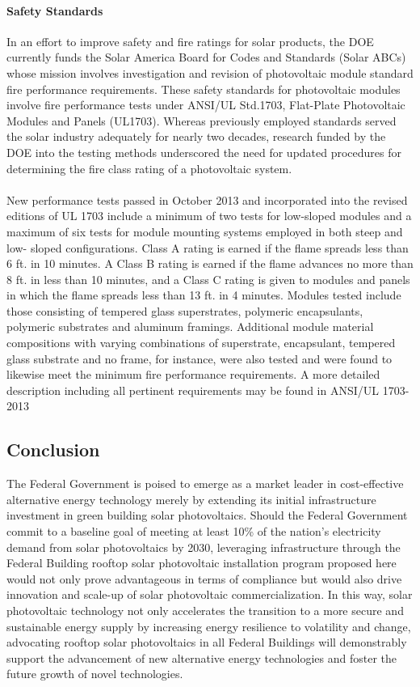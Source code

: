 \paragraph{Safety Standards}
In an effort to improve safety and fire ratings for solar products, the DOE currently funds the Solar America Board for Codes and Standards (Solar ABCs) whose mission involves investigation and revision of photovoltaic module standard fire performance requirements. These safety standards for photovoltaic modules involve fire performance tests under ANSI/UL Std.1703, Flat-Plate Photovoltaic Modules and Panels (UL1703). Whereas previously employed standards served the solar industry adequately for nearly two decades, research funded by the DOE into the testing methods underscored the need for updated procedures for determining the fire class rating of a photovoltaic system.
\\\\
\noindent New performance tests passed in October 2013 and incorporated into the revised editions of UL 1703 include a minimum of two tests for low-sloped modules and a maximum of six tests for module mounting systems employed in both steep and low- sloped configurations. Class A rating is earned if the flame spreads less than 6 ft. in 10 minutes. A Class B rating is earned if the flame advances no more than 8 ft. in less than 10 minutes, and a Class C rating is given to modules and panels in which the flame spreads less than 13 ft. in 4 minutes. Modules tested include those consisting of tempered glass superstrates, polymeric encapsulants, polymeric substrates and aluminum framings. Additional module material compositions with varying combinations of superstrate, encapsulant, tempered glass substrate and no frame, for instance, were also tested and were found to likewise meet the minimum fire performance requirements. A more detailed description including all pertinent requirements may be found in ANSI/UL 1703-2013

\subsection{Conclusion}
The Federal Government is poised to emerge as a market leader in cost-effective alternative energy technology merely by extending its initial infrastructure investment in green building solar photovoltaics. Should the Federal Government commit to a baseline goal of meeting at least 10\% of the nation’s electricity demand from solar photovoltaics by 2030, leveraging infrastructure through the Federal Building rooftop solar photovoltaic installation program proposed here would not only prove advantageous in terms of compliance but would also drive innovation and scale-up of solar photovoltaic commercialization. In this way, solar photovoltaic technology not only accelerates the transition to a more secure and sustainable energy supply by increasing energy resilience to volatility and change, advocating rooftop solar photovoltaics in all Federal Buildings will demonstrably support the advancement of new alternative energy technologies and foster the future growth of novel technologies.

